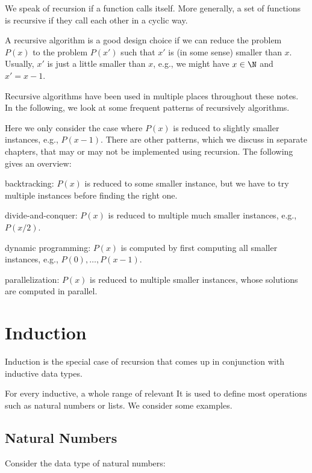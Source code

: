 We speak of recursion if a function calls itself.
More generally, a set of functions is recursive if they call each other in a cyclic way.

A recursive algorithm is a good design choice if we can reduce the problem $P(x)$ to the problem $P(x')$ such that $x'$ is (in some sense) smaller than $x$.
Usually, $x'$ is just a little smaller than $x$, e.g., we might have $x\in\N$ and $x'=x-1$.

Recursive algorithms have been used in multiple places throughout these notes.
In the following, we look at some frequent patterns of recursively algorithms.

Here we only consider the case where $P(x)$ is reduced to slightly smaller instances, e.g., $P(x-1)$.
There are other patterns, which we discuss in separate chapters, that may or may not be implemented using recursion.
The following gives an overview:
\begin{compactitem}
  \item backtracking: $P(x)$ is reduced to some smaller instance, but we have to try multiple instances before finding the right one.
  \item divide-and-conquer: $P(x)$ is reduced to multiple much smaller instances, e.g., $P(x/2)$.
  \item dynamic programming: $P(x)$ is computed by first computing all smaller instances, e.g., $P(0),\ldots,P(x-1)$.
  \item parallelization: $P(x)$ is reduced to multiple smaller instances, whose solutions are computed in parallel.
\end{compactitem}

\section{Induction}

Induction is the special case of recursion that comes up in conjunction with inductive data types.

For every inductive, a whole range of relevant It is used to define most operations  such as natural numbers or lists.
We consider some examples.

\subsection{Natural Numbers}

Consider the data type of natural numbers:
\begin{acode}
\end{acode}

